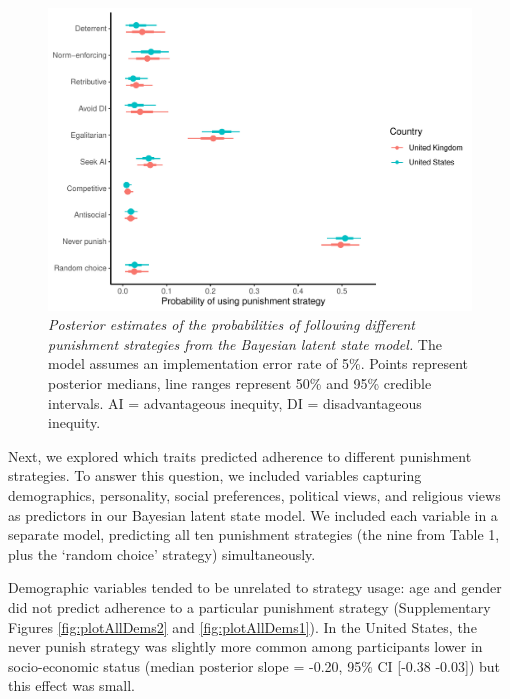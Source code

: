 \documentclass[
  english,
  man, donotrepeattitle,floatsintext]{apa6}
\begin{document}
\begin{figure}
\centering
\includegraphics{manuscript_files/figure-latex/plotModel1b-1.pdf}
\caption{\label{fig:plotModel1b}\emph{Posterior estimates of the probabilities of following
different punishment strategies from the Bayesian latent state model.} The model
assumes an implementation error rate of 5\%. Points represent posterior medians,
line ranges represent 50\% and 95\% credible intervals. AI = advantageous
inequity, DI = disadvantageous inequity.}
\end{figure}

Next, we explored which traits predicted adherence to different punishment
strategies. To answer this question, we included variables capturing
demographics, personality, social preferences, political views, and religious
views as predictors in our Bayesian latent state model. We included each
variable in a separate model, predicting all ten punishment strategies
(the nine from Table 1, plus the `random choice' strategy) simultaneously.

Demographic variables tended to be unrelated to strategy usage: age and gender
did not predict adherence to a particular punishment strategy (Supplementary
Figures \ref{fig:plotAllDems2} and \ref{fig:plotAllDems1}). In the United
States, the never punish strategy was slightly more common among participants
lower in socio-economic status (median posterior slope =
-0.20, 95\% CI {[}-0.38
-0.03{]}) but this effect was small.
\end{document}

